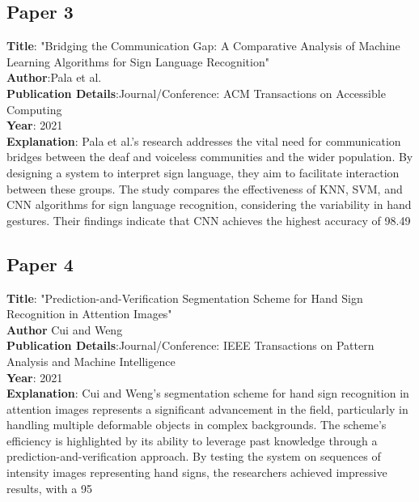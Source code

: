 \subsection{Paper 3} \textbf{Title}: "Bridging the Communication Gap: A Comparative Analysis of Machine Learning Algorithms for Sign Language Recognition"
 \\
\textbf{Author}:Pala et al.
 \\
\textbf{Publication Details}:Journal/Conference: ACM Transactions on Accessible Computing
 \\
\textbf{Year}: 2021 \\
\textbf{Explanation}: Pala et al.'s research addresses the vital need for communication bridges between the deaf and voiceless communities and the wider population. By designing a system to interpret sign language, they aim to facilitate interaction between these groups. The study compares the effectiveness of KNN, SVM, and CNN algorithms for sign language recognition, considering the variability in hand gestures. Their findings indicate that CNN achieves the highest accuracy of 98.49%

\subsection{Paper 4} \textbf{Title}: "Prediction-and-Verification Segmentation Scheme for Hand Sign Recognition in Attention Images"
 \\
\textbf{Author} Cui and Weng
 \\
\textbf{Publication Details}:Journal/Conference: IEEE Transactions on Pattern Analysis and Machine Intelligence
 \\
\textbf{Year}: 2021 \\
\textbf{Explanation}: Cui and Weng's segmentation scheme for hand sign recognition in attention images represents a significant advancement in the field, particularly in handling multiple deformable objects in complex backgrounds. The scheme's efficiency is highlighted by its ability to leverage past knowledge through a prediction-and-verification approach. By testing the system on sequences of intensity images representing hand signs, the researchers achieved impressive results, with a 95%

